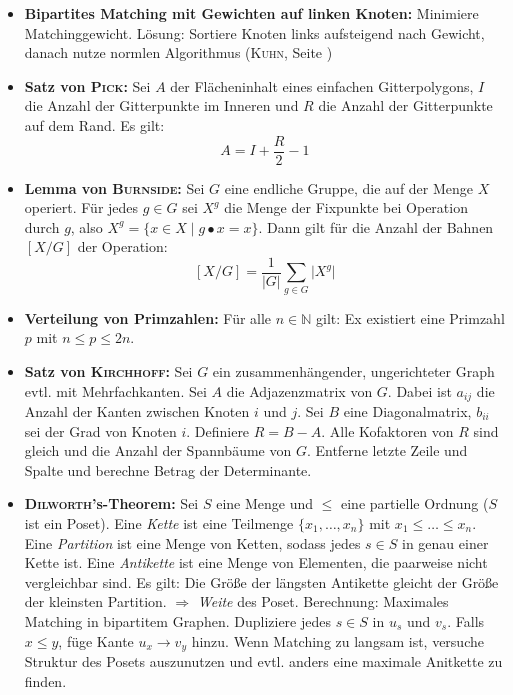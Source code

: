 \begin{itemize}
	\item \textbf{Bipartites Matching mit Gewichten auf linken Knoten:}
	Minimiere Matchinggewicht.
	Lösung: Sortiere Knoten links aufsteigend nach Gewicht, danach nutze normlen Algorithmus (\textsc{Kuhn}, Seite \pageref{kuhn})

	\item \textbf{Satz von \textsc{Pick}:}
	Sei $A$ der Flächeninhalt eines einfachen Gitterpolygons, $I$ die Anzahl der Gitterpunkte im Inneren und $R$ die Anzahl der Gitterpunkte auf dem Rand.
	Es gilt:
	\[
		A = I + \frac{R}{2} - 1
	\]

	\item \textbf{Lemma von \textsc{Burnside}:}
	Sei $G$ eine endliche Gruppe, die auf der Menge $X$ operiert.
	Für jedes $g \in G$ sei $X^g$ die Menge der Fixpunkte bei Operation durch $g$, also $X^g = \{x \in X \mid g \bullet x = x\}$.
	Dann gilt für die Anzahl der Bahnen $[X/G]$ der Operation:
	\[
		[X/G] = \frac{1}{\vert G \vert} \sum_{g \in G} \vert X^g \vert
	\]

	\item \textbf{Verteilung von Primzahlen:}
	Für alle $n \in \mathbb{N}$ gilt: Ex existiert eine Primzahl $p$ mit $n \leq p \leq 2n$.

	\item \textbf{Satz von \textsc{Kirchhoff}:}
	Sei $G$ ein zusammenhängender, ungerichteter Graph evtl. mit Mehrfachkanten.
	Sei $A$ die Adjazenzmatrix von $G$.
	Dabei ist $a_{ij}$ die Anzahl der Kanten zwischen Knoten $i$ und $j$.
	Sei $B$ eine Diagonalmatrix, $b_{ii}$ sei der Grad von Knoten $i$.
	Definiere $R = B - A$.
	Alle Kofaktoren von $R$ sind gleich und die Anzahl der Spannbäume von $G$.
	\newline
	Entferne letzte Zeile und Spalte und berechne Betrag der Determinante.

	\item \textbf{\textsc{Dilworth}'s-Theorem:}
	Sei $S$ eine Menge und $\leq$ eine partielle Ordnung ($S$ ist ein Poset).
	Eine \emph{Kette} ist eine Teilmenge $\{x_1,\ldots,x_n\}$ mit $x_1 \leq \ldots \leq x_n$.
	Eine \emph{Partition} ist eine Menge von Ketten, sodass jedes $s \in S$ in genau einer Kette ist.
	Eine \emph{Antikette} ist eine Menge von Elementen, die paarweise nicht vergleichbar sind.
	\newline
	Es gilt: Die Größe der längsten Antikette gleicht der Größe der kleinsten Partition.
	$\Rightarrow$ \emph{Weite} des Poset.
	\newline
	Berechnung: Maximales Matching in bipartitem Graphen.
	Dupliziere jedes $s \in S$ in $u_s$ und $v_s$.
	Falls $x \leq y$, füge Kante $u_x \to v_y$ hinzu.
	Wenn Matching zu langsam ist, versuche Struktur des Posets auszunutzen und evtl. anders eine maximale Anitkette zu finden.


\end{itemize}
